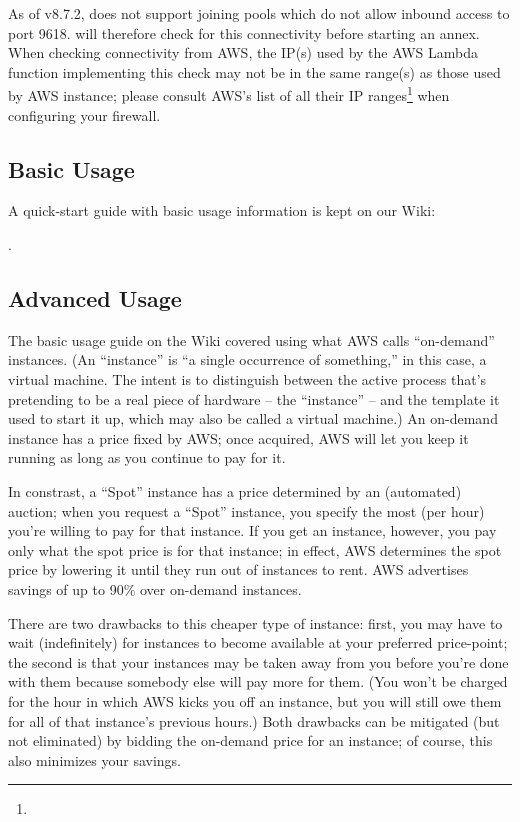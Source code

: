 As of v8.7.2,  does not support joining pools which do not
allow inbound access to port 9618.   will therefore check
for this connectivity before starting an annex.  When checking connectivity
from AWS, the IP(s) used by the AWS Lambda function implementing this check
may not be in the same range(s) as those used by AWS instance; please
consult AWS's list of all their IP
ranges\footnote{}
when configuring your firewall.

\subsection{Basic Usage}

A quick-start guide with basic usage information is kept on our Wiki:


.

\subsection{Advanced Usage}

The basic usage guide on the Wiki covered using what AWS calls ``on-demand''
instances.  (An ``instance'' is ``a single occurrence of something,'' in
this case, a virtual machine.  The intent is to distinguish between the
active process that's pretending to be a real piece of hardware --
the ``instance'' -- and the template it used to start it up, which may also
be called a virtual machine.)  An on-demand instance has a price fixed by AWS;
once acquired, AWS will let you keep it running as long as you continue to
pay for it.

In constrast, a ``Spot'' instance has a price determined by an (automated)
auction; when you request a ``Spot'' instance, you specify the most (per hour)
you're willing to pay for that instance.  If you get an instance, however,
you pay only what the spot price is for that instance; in effect, AWS
determines the spot price by lowering it until they run out of instances
to rent.  AWS advertises savings of up to 90\% over on-demand instances.

There are two drawbacks to this cheaper type of instance: first,
you may have to wait (indefinitely) for instances to become available at
your preferred price-point; the second is that your instances may be taken
away from you before you're done with them because somebody else will pay
more for them.  (You won't be charged for the hour in which AWS kicks
you off an instance, but you will still owe them for all of that instance's
previous hours.)  Both drawbacks can be mitigated (but not eliminated) by
bidding the on-demand price for an instance; of course, this also minimizes
your savings.

